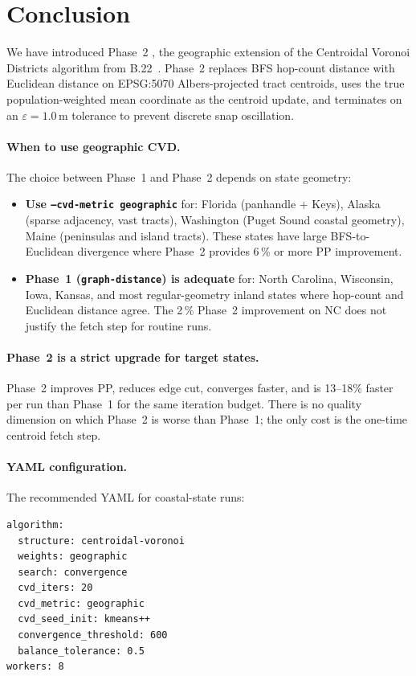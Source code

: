 \section{Conclusion}
\label{sec:conclusion}

We have introduced Phase~2 \cvdgeo{}, the geographic extension of the
Centroidal Voronoi Districts algorithm from B.22~\citep{dellaLibera2026cvd}.
Phase~2 replaces BFS hop-count distance with Euclidean distance on
EPSG:5070 Albers-projected tract centroids, uses the true population-weighted
mean coordinate as the centroid update, and terminates on an
$\varepsilon = 1.0$\,m tolerance to prevent discrete snap oscillation.

\paragraph{When to use geographic CVD.}
The choice between Phase~1 and Phase~2 depends on state geometry:

\begin{itemize}
\item \textbf{Use \texttt{--cvd-metric geographic}} for:
  Florida (panhandle + Keys), Alaska (sparse adjacency, vast tracts),
  Washington (Puget Sound coastal geometry), Maine (peninsulas and island tracts).
  These states have large BFS-to-Euclidean divergence where Phase~2 provides
  6\,\% or more PP improvement.

\item \textbf{Phase~1 (\texttt{graph-distance}) is adequate} for:
  North Carolina, Wisconsin, Iowa, Kansas, and most regular-geometry inland
  states where hop-count and Euclidean distance agree.
  The 2\,\% Phase~2 improvement on NC does not justify the fetch step for
  routine runs.
\end{itemize}

\paragraph{Phase~2 is a strict upgrade for target states.}
Phase~2 improves PP, reduces edge cut, converges faster, and is 13--18\%
faster per run than Phase~1 for the same iteration budget.
There is no quality dimension on which Phase~2 is worse than Phase~1;
the only cost is the one-time centroid fetch step.

\paragraph{YAML configuration.}
The recommended YAML for coastal-state runs:
\begin{verbatim}
algorithm:
  structure: centroidal-voronoi
  weights: geographic
  search: convergence
  cvd_iters: 20
  cvd_metric: geographic
  cvd_seed_init: kmeans++
  convergence_threshold: 600
  balance_tolerance: 0.5
workers: 8
\end{verbatim}

